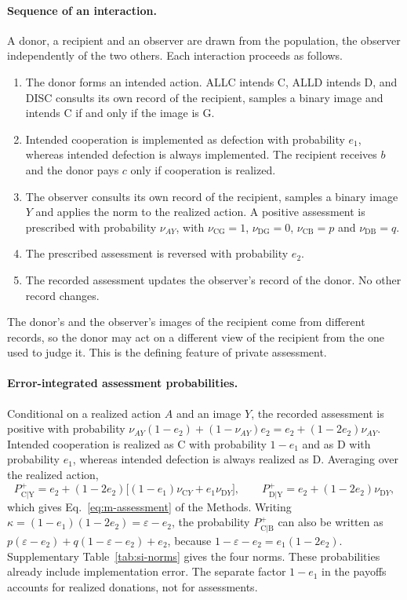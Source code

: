 \documentclass[fleqn,10pt]{wlscirep}
\newcommand{\Pp}[1]{P^{+}_{\mathrm{#1}}}   %
\theoremstyle{plain}
\begin{document}
\paragraph{Sequence of an interaction.} A donor, a recipient and an observer are drawn from the population, the observer independently of the two others. Each interaction proceeds as follows.
\begin{enumerate}
\item The donor forms an intended action. ALLC intends C, ALLD intends D, and DISC consults its own record of the recipient, samples a binary image and intends C if and only if the image is G.
\item Intended cooperation is implemented as defection with probability $e_1$, whereas intended defection is always implemented. The recipient receives $b$ and the donor pays $c$ only if cooperation is realized.
\item The observer consults its own record of the recipient, samples a binary image $Y$ and applies the norm to the realized action. A positive assessment is prescribed with probability $\nu_{AY}$, with $\nu_{\mathrm{CG}}=1$, $\nu_{\mathrm{DG}}=0$, $\nu_{\mathrm{CB}}=p$ and $\nu_{\mathrm{DB}}=q$.
\item The prescribed assessment is reversed with probability $e_2$.
\item The recorded assessment updates the observer's record of the donor. No other record changes.
\end{enumerate}
The donor's and the observer's images of the recipient come from different records, so the donor may act on a different view of the recipient from the one used to judge it. This is the defining feature of private assessment.

\paragraph{Error-integrated assessment probabilities.} Conditional on a realized action $A$ and an image $Y$, the recorded assessment is positive with probability $\nu_{AY}(1-e_2)+(1-\nu_{AY})e_2=e_2+(1-2e_2)\nu_{AY}$. Intended cooperation is realized as C with probability $1-e_1$ and as D with probability $e_1$, whereas intended defection is always realized as D. Averaging over the realized action,
\begin{equation}
\Pp{C|Y}=e_2+(1-2e_2)\bigl[(1-e_1)\nu_{\mathrm CY}+e_1\nu_{\mathrm DY}\bigr],\qquad
\Pp{D|Y}=e_2+(1-2e_2)\nu_{\mathrm DY},
\label{eq:s-assessment-general}
\end{equation}
which gives Eq.~\eqref{eq:m-assessment} of the Methods. Writing $\kappa=(1-e_1)(1-2e_2)=\varepsilon-e_2$, the probability $\Pp{C|B}$ can also be written as $p(\varepsilon-e_2)+q(1-\varepsilon-e_2)+e_2$, because $1-\varepsilon-e_2=e_1(1-2e_2)$. Supplementary Table~\ref{tab:si-norms} gives the four norms. These probabilities already include implementation error. The separate factor $1-e_1$ in the payoffs accounts for realized donations, not for assessments.
\end{document}
